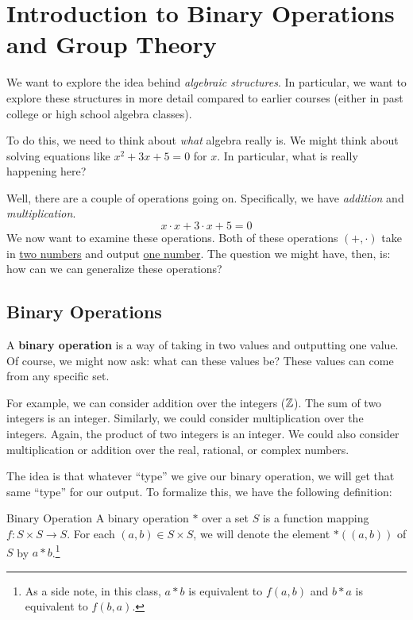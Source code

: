 \documentclass[letterpaper]{article}
\begin{document}
\newpage 
\section{Introduction to Binary Operations and Group Theory}
We want to explore the idea behind \emph{algebraic structures}. In particular, we want to explore these structures in more detail compared to earlier courses (either in past college or high school algebra classes). 

\bigskip 

To do this, we need to think about \emph{what} algebra really is. We might think about solving equations like $x^2 + 3x + 5 = 0$ for $x$. In particular, what is really happening here?

\bigskip 

Well, there are a couple of operations going on. Specifically, we have \emph{addition} and \emph{multiplication}. 
\[x \cdot x + 3 \cdot x + 5 = 0\]
We now want to examine these operations. Both of these operations $(+, \cdot)$ take in \underline{two numbers} and output \underline{one number}. The question we might have, then, is: how can we can generalize these operations?

\subsection{Binary Operations}
A \textbf{binary operation} is a way of taking in two values and outputting one value. Of course, we might now ask: what can these values be? These values can come from any specific set. 

\bigskip 

For example, we can consider addition over the integers ($\mathbb{Z}$). The sum of two integers is an integer. Similarly, we could consider multiplication over the integers. Again, the product of two integers is an integer. We could also consider multiplication or addition over the real, rational, or complex numbers. 

\bigskip 

The idea is that whatever ``type'' we give our binary operation, we will get that same ``type'' for our output. To formalize this, we have the following definition:  
\begin{definition}{Binary Operation}{}
    A binary operation $*$ over a set $S$ is a function mapping $f: S \times S \to S$. For each $(a, b) \in S \times S$, we will denote the element $*((a, b))$ of $S$ by $a * b$.\footnote{As a side note, in this class, $a * b$ is equivalent to $f(a, b)$ and $b * a$ is equivalent to $f(b, a)$.}
\end{definition}
\end{document}
